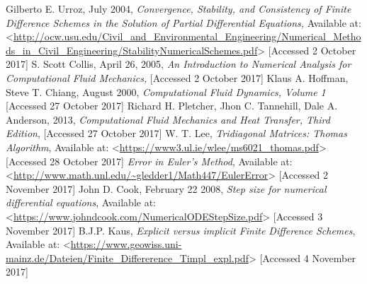 \documentclass[12pt]{report}
\begin{document}
Gilberto E. Urroz, July 2004, \textit{Convergence, Stability, and Consistency of Finite
Difference Schemes in the Solution of Partial Differential
Equations,} Available at: <\url{http://ocw.usu.edu/Civil_and_Environmental_Engineering/Numerical_Methods_in_Civil_Engineering/StabilityNumericalSchemes.pdf}> [Accessed 2 October 2017]
\newline
\newline
S. Scott Collis, April 26, 2005, \textit{An Introduction to Numerical Analysis
for Computational Fluid Mechanics,} [Accessed 2 October 2017]
\newline
\newline
Klaus A. Hoffman, Steve T. Chiang, August 2000, \textit{Computational Fluid Dynamics, Volume 1} [Accessed 27 October 2017]
\newline
\newline
Richard H. Pletcher, Jhon C. Tannehill, Dale A. Anderson, 2013, \textit{Computational Fluid Mechanics and Heat Transfer, Third Edition}, [Accessed 27 October 2017]
\newline
\newline
W. T. Lee, \textit{Tridiagonal Matrices: Thomas Algorithm}, Available at: <\url{https://www3.ul.ie/wlee/ms6021_thomas.pdf}> [Accessed 28 October 2017]
\newline
\newline
\textit{ Error in Euler’s Method}, Available at: <\url{http://www.math.unl.edu/~gledder1/Math447/EulerError}> [Accessed 2 November 2017]
\newline
\newline
John D. Cook, February 22 2008, \textit{ Step size for numerical differential equations}, Available at: <\url{https://www.johndcook.com/NumericalODEStepSize.pdf}> [Accessed 3 November 2017]
\newline
\newline
B.J.P. Kaus, \textit{Explicit versus implicit Finite Difference Schemes}, Available at: <\url{https://www.geowiss.uni-mainz.de/Dateien/Finite_Differerence_Timpl_expl.pdf}> [Accessed 4 November 2017]
\end{document}
